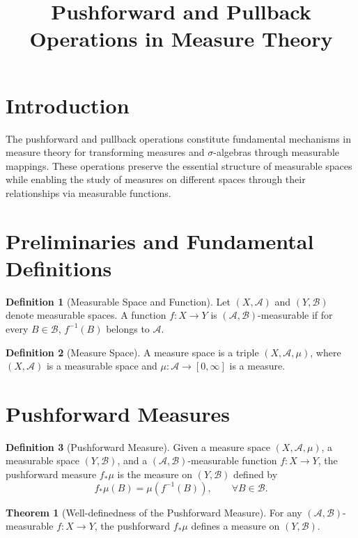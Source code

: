 \documentclass[12pt]{article}
\title{Pushforward and Pullback Operations in Measure Theory}
\author{}
\date{}
\theoremstyle{definition}
\newtheorem{definition}{Definition}[section]
\newtheorem{theorem}{Theorem}[section]
\begin{document}
\maketitle

\section{Introduction}

The pushforward and pullback operations constitute fundamental mechanisms in measure theory for transforming measures and $\sigma$-algebras through measurable mappings. These operations preserve the essential structure of measurable spaces while enabling the study of measures on different spaces through their relationships via measurable functions.

\section{Preliminaries and Fundamental Definitions}

\begin{definition}[Measurable Space and Function]
Let $(X, \mathscr{A})$ and $(Y, \mathscr{B})$ denote measurable spaces. A function $f: X \to Y$ is $(\mathscr{A}, \mathscr{B})$-measurable if for every $B \in \mathscr{B}$, $f^{-1}(B)$ belongs to $\mathscr{A}$.
\end{definition}

\begin{definition}[Measure Space]
A measure space is a triple $(X, \mathscr{A}, \mu)$, where $(X, \mathscr{A})$ is a measurable space and $\mu: \mathscr{A} \to [0, \infty]$ is a measure.
\end{definition}

\section{Pushforward Measures}

\begin{definition}[Pushforward Measure]
Given a measure space $(X, \mathscr{A}, \mu)$, a measurable space $(Y, \mathscr{B})$, and a $(\mathscr{A}, \mathscr{B})$-measurable function $f: X \to Y$, the pushforward measure $f_{*}\mu$ is the measure on $(Y, \mathscr{B})$ defined by
\[
f_{*}\mu(B) = \mu\left( f^{-1}(B) \right), \qquad \forall B \in \mathscr{B}.
\]
\end{definition}

\begin{theorem}[Well-definedness of the Pushforward Measure]
For any $(\mathscr{A}, \mathscr{B})$-measurable $f: X \to Y$, the pushforward $f_{*}\mu$ defines a measure on $(Y, \mathscr{B})$.
\end{theorem}
\end{document}
